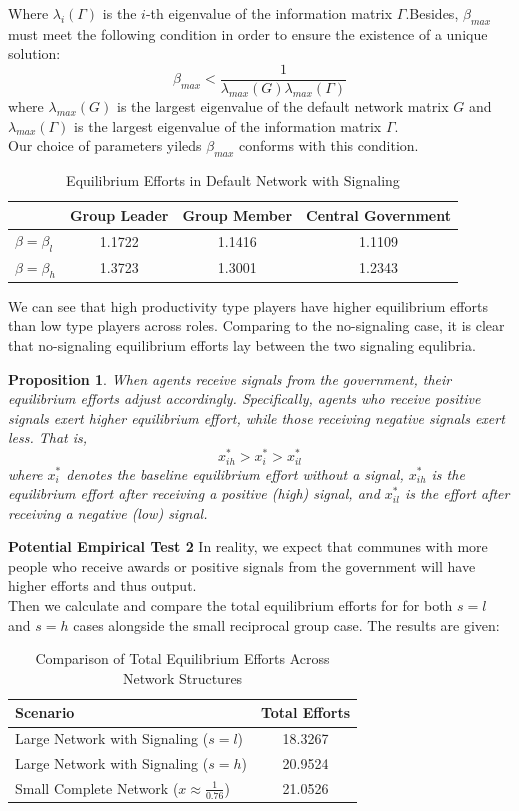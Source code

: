 \documentclass[12pt]{article}
\newtheorem{proposition}{Proposition}
\begin{document}
  Where $\lambda_i(\Gamma)$ is the $i$-th eigenvalue of the information matrix $\Gamma$.Besides, $\beta_{max}$ must meet the following condition in order to ensure the existence of a unique solution:
\[
\beta_{max} < \frac{1}{\lambda_{max}(G)\lambda_{max}(\Gamma)}
\] 
  where $\lambda_{max}(G)$ is the largest eigenvalue of the default network matrix $G$  and $\lambda_{max}(\Gamma)$ is the largest eigenvalue of the information matrix $\Gamma$.\\
Our choice of parameters yileds $\beta_{max}$ conforms with this condition. \\
\begin{table}[H]
  \centering
  \caption{Equilibrium Efforts in Default Network with Signaling}
  \begin{tabular}{lccc}
  \toprule
   & \textbf{Group Leader} & \textbf{Group Member} & \textbf{Central Government} \\
  \midrule
  \(\beta = \beta_l\) & 1.1722 & 1.1416 & 1.1109 \\
  \(\beta = \beta_h\) & 1.3723 & 1.3001 & 1.2343 \\
  \bottomrule
  \end{tabular}
  \end{table}
  We can see that high productivity type players have higher equilibrium efforts than low type players across roles. Comparing to the no-signaling case, it is clear that no-signaling equilibrium efforts lay between the two signaling equlibria. 
  \begin{proposition}
    When agents receive signals from the government, their equilibrium efforts adjust accordingly. Specifically, agents who receive positive signals exert higher equilibrium effort, while those receiving negative signals exert less. That is,
    \[
    x^*_{ih} > x^*_i > x^*_{il}
    \]
    where \( x^*_i \) denotes the baseline equilibrium effort without a signal, \( x^*_{ih} \) is the equilibrium effort after receiving a positive (high) signal, and \( x^*_{il} \) is the effort after receiving a negative (low) signal.
    \end{proposition}
\noindent \textbf{Potential Empirical Test 2} In reality, we expect that communes with more people who receive awards or positive signals from the government will have higher efforts and thus output.\\
    Then we calculate and compare the total equilibrium efforts for for both $s=l$ and $s=h$ cases alongside the small reciprocal group case. The results are given:
\begin{table}[H]
  \centering
  \caption{Comparison of Total Equilibrium Efforts Across Network Structures}
  \begin{tabular}{l c}
  \toprule
  \textbf{Scenario} & \textbf{Total Efforts} \\
  \midrule
  Large Network with Signaling (\( s = l \)) & 18.3267 \\
  Large Network with Signaling (\( s = h \)) & 20.9524 \\
  Small Complete Network (\( x \approx \frac{1}{0.76} \)) & 21.0526 \\
  \bottomrule
  \end{tabular}
  \end{table}
\end{document}
